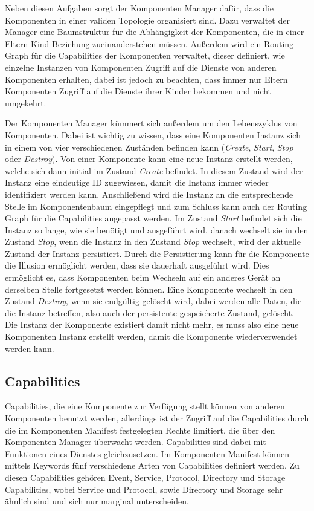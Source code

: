 \documentclass[a4paper]{scrartcl}
\begin{document}
Neben diesen Aufgaben sorgt der Komponenten Manager dafür, dass die Komponenten in einer validen Topologie organisiert sind. Dazu verwaltet der Manager eine Baumstruktur für die Abhängigkeit der Komponenten, die in einer Eltern-Kind-Beziehung zueinanderstehen müssen. Außerdem wird ein Routing Graph für die Capabilities der Komponenten verwaltet, dieser definiert, wie einzelne Instanzen von Komponenten Zugriff auf die Dienste von anderen Komponenten erhalten, dabei ist jedoch zu beachten, dass immer nur Eltern Komponenten Zugriff auf die Dienste ihrer Kinder bekommen und nicht umgekehrt. \cite{Fuchsia.Component.Topology}

Der Komponenten Manager kümmert sich außerdem um den Lebenszyklus von Komponenten. Dabei ist wichtig zu wissen, dass eine Komponenten Instanz sich in einem von vier verschiedenen Zuständen befinden kann (\textit{Create}, \textit{Start}, \textit{Stop} oder \textit{Destroy}). Von einer Komponente kann eine neue Instanz erstellt werden, welche sich dann initial im Zustand \textit{Create} befindet. In diesem Zustand wird der Instanz eine eindeutige ID zugewiesen, damit die Instanz immer wieder identifiziert werden kann. Anschließend wird die Instanz an die entsprechende Stelle im Komponentenbaum eingepflegt und zum Schluss kann auch der Routing Graph für die Capabilities angepasst werden. Im Zustand \textit{Start} befindet sich die Instanz so lange, wie sie benötigt und ausgeführt wird, danach wechselt sie in den Zustand \textit{Stop}, wenn die Instanz in den Zustand \textit{Stop} wechselt, wird der aktuelle Zustand der Instanz persistiert. Durch die Persistierung kann für die Komponente die Illusion ermöglicht werden, dass sie dauerhaft ausgeführt wird. Dies ermöglicht es, dass Komponenten beim Wechseln auf ein anderes Gerät an derselben Stelle fortgesetzt werden können. Eine Komponente wechselt in den Zustand \textit{Destroy}, wenn sie endgültig gelöscht wird, dabei werden alle Daten, die die Instanz betreffen, also auch der persistente gespeicherte Zustand, gelöscht. Die Instanz der Komponente existiert damit nicht mehr, es muss also eine neue Komponenten Instanz erstellt werden, damit die Komponente wiederverwendet werden kann. \cite{Fuchsia.Component.Lifecycle}
\subsection{Capabilities}
\label{sec:Capabilities}
Capabilities, die eine Komponente zur Verfügung stellt können von anderen Komponenten benutzt werden, allerdings ist der Zugriff auf die Capabilities durch die im Komponenten Manifest festgelegten Rechte limitiert, die über den Komponenten Manager überwacht werden. Capabilities sind dabei mit Funktionen eines Dienstes gleichzusetzen. Im Komponenten Manifest können mittels Keywords fünf verschiedene Arten von Capabilities definiert werden. Zu diesen Capabilities gehören Event, Service, Protocol, Directory und Storage Capabilities, wobei Service und Protocol, sowie Directory und Storage sehr ähnlich sind und sich nur marginal unterscheiden.
\end{document}
